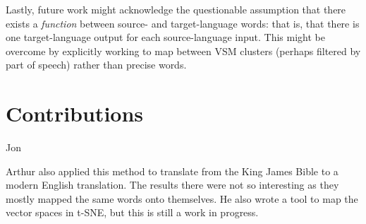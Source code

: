 \documentclass[11pt]{article}
\begin{document}
Lastly, future work might acknowledge the questionable assumption that there
exists a \emph{function} between source- and target-language words: that is,
that there is one target-language output for each source-language input. This
might be overcome by explicitly working to map between VSM clusters (perhaps
filtered by part of speech) rather than precise words. %


\section{Contributions}
\label{sec:contributions}
Jon

Arthur also applied this method to translate from the King James Bible
to a modern English translation. The results there were not so
interesting as they mostly mapped the same words onto themselves. He
also wrote a tool to map the vector spaces in t-SNE, but this is still
a work in progress.



\end{document}
